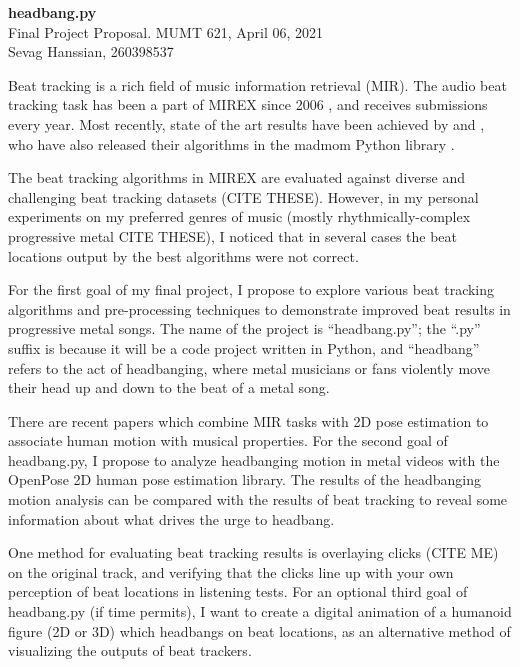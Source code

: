 \documentclass[letter,12pt]{report}
\begin{document}
\Large{\textbf{headbang.py}}\\
\large{Final Project Proposal. MUMT 621, April 06, 2021}\\
\large{Sevag Hanssian, 260398537}

\vspace{2em}

Beat tracking is a rich field of music information retrieval (MIR). The audio beat tracking task has been a part of MIREX since 2006 \cite{mirex06}, and receives submissions every year. Most recently, state of the art results have been achieved by \cite{bock1} and \cite{bock2}, who have also released their algorithms in the madmom Python library \cite{madmom}.

\vspace{1em}

\qquad The beat tracking algorithms in MIREX are evaluated against diverse and challenging beat tracking datasets (CITE THESE). However, in my personal experiments on my preferred genres of music (mostly rhythmically-complex progressive metal CITE THESE), I noticed that in several cases the beat locations output by the best algorithms were not correct.

\vspace{1em}

\qquad For the first goal of my final project, I propose to explore various beat tracking algorithms and pre-processing techniques to demonstrate improved beat results in progressive metal songs. The name of the project is ``headbang.py''; the ``.py'' suffix is because it will be a code project written in Python, and ``headbang'' refers to the act of headbanging, where metal musicians or fans violently move their head up and down to the beat of a metal song.

\vspace{1em}

\qquad There are recent papers which combine MIR tasks with 2D pose estimation to associate human motion with musical properties. For the second goal of headbang.py, I propose to analyze headbanging motion in metal videos with the OpenPose 2D human pose estimation library. The results of the headbanging motion analysis can be compared with the results of beat tracking to reveal some information about what drives the urge to headbang.

\vspace{1em}

\qquad One method for evaluating beat tracking results is overlaying clicks (CITE ME) on the original track, and verifying that the clicks line up with your own perception of beat locations in listening tests. For an optional third goal of headbang.py (if time permits), I want to create a digital animation of a humanoid figure (2D or 3D) which headbangs on beat locations, as an alternative method of visualizing the outputs of beat trackers.

\vfill
\clearpage

\nocite{*}
\printbibheading[title={\vspace{-3.5em}References},heading=bibnumbered]
\vspace{-1.5em}
\printbibliography[heading=none]
\end{document}

